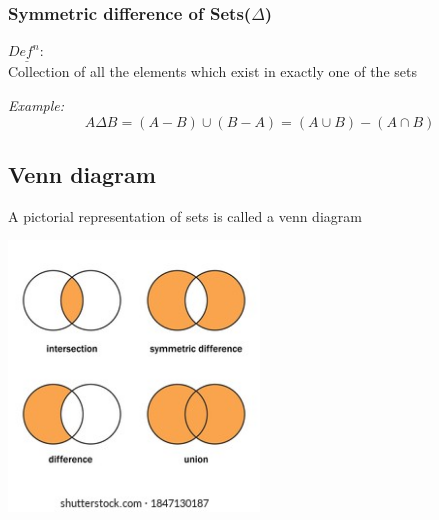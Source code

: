 \documentclass[11pt,letterpaper]{article}
\newenvironment{example}                             
        {\textit{Example:}\\}
	{}
\newenvironment{definition}
	{\begin{mdframed}$\underline{\textit{Def}^\textit{n}:} $\\}
	{\end{mdframed}}
\begin{document}
\subsubsection{Symmetric difference of Sets($\Delta$)}
\begin{definition}
  Collection of all the elements which exist in exactly one of the sets
\end{definition}
\begin{example}
  \[
    A\Delta B= (A-B) \cup (B-A) = (A\cup B) - (A\cap B)
  \]
\end{example}

\subsection{Venn diagram}
A pictorial representation of sets is called a venn diagram\\
\begin{center}
  \includegraphics[width=0.5\textwidth]{figs/venn diagram.png}
\end{center}
\end{document}
